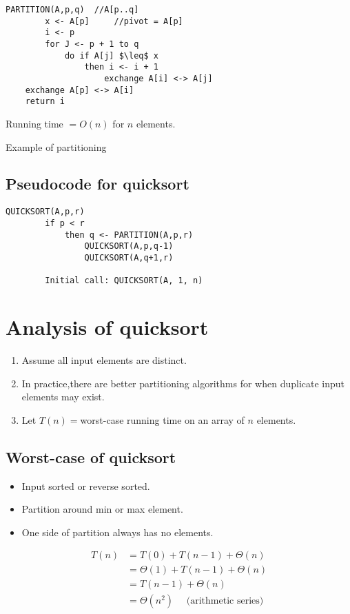 \documentclass[11pt,toc=twocol]{elegantbook}
\begin{document}
\begin{lstlisting}[mathescape=true]
    PARTITION(A,p,q)  //A[p..q]
        x <- A[p]     //pivot = A[p]
        i <- p
        for J <- p + 1 to q
            do if A[j] $\leq$ x
                then i <- i + 1
                    exchange A[i] <-> A[j]
    exchange A[p] <-> A[i]
    return i
\end{lstlisting}
\begin{note}
    Running time $=O(n)$ for $n$ elements.
\end{note}
\begin{example}
    Example of partitioning
\end{example}
\subsection{Pseudocode for quicksort}
\begin{lstlisting}[mathescape=true]
    QUICKSORT(A,p,r)
        if p < r
            then q <- PARTITION(A,p,r)
                QUICKSORT(A,p,q-1)
                QUICKSORT(A,q+1,r)

        Initial call: QUICKSORT(A, 1, n)
\end{lstlisting}  
\section{Analysis of quicksort}
\begin{enumerate}
    \item Assume all input elements are distinct.

    \item In practice,there are better partitioning algorithms for when duplicate input elements may exist.
    
    \item Let $T(n)=$worst-case running time on an array of $n$ elements.
\end{enumerate}
\subsection{Worst-case of quicksort}
\begin{itemize}
    \item Input sorted or reverse sorted.

    \item Partition around min or max element.
    
    \item One side of partition always has no elements.
\end{itemize}
$$
\begin{aligned}
T(n) &=T(0)+T(n-1)+\Theta(n) \\
&=\Theta(1)+T(n-1)+\Theta(n) \\
&=T(n-1)+\Theta(n) \\
&=\Theta\left(n^{2}\right) \quad \text { (arithmetic series) }
\end{aligned}
$$
\end{document}
